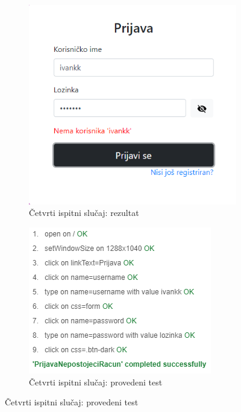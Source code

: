  			\begin{figure}[H]
 			\centering
 			\begin{subfigure}{.5\textwidth}
 				\centering
 				\includegraphics[scale=0.4]{slike/test4Ekran.png}
 				\caption{Četvrti ispitni slučaj: rezultat}
 				\label{fig:cetvrtiIspitniSlucaj}
 			\end{subfigure}%
 			\begin{subfigure}{.5\textwidth}
 				\centering
 				\includegraphics[scale=0.7]{slike/test4.png}
 				\caption{Četvrti ispitni slučaj: provedeni test}
 				\label{fig:cetvrtiIspitniSlucajTest}%
 			\end{subfigure}
 		\end{figure}
 	

